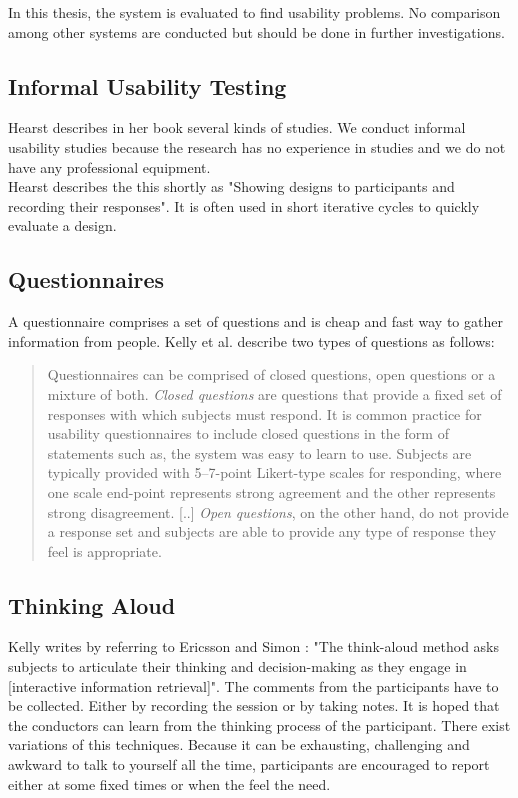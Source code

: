 \documentclass[11pt]{report}
\begin{document}
{{In this thesis, the system is evaluated to find usability problems. No comparison among other systems are conducted but should be done in further investigations.

\subsection{Informal Usability Testing}

Hearst \cite{Hearst2009} describes in her book several kinds of studies. We conduct informal usability studies because the research has no experience in studies and we do not have any professional equipment. \\

Hearst \cite{Hearst2009} describes the this shortly as "Showing designs to participants and recording their responses". It is often used in short iterative cycles to quickly evaluate a design.

\subsection{Questionnaires}

A questionnaire comprises a set of questions and is cheap and fast way to gather information from people. Kelly et al. \cite{Kelly2008} describe two types of questions as follows:

\begin{quote}
	Questionnaires can be comprised of closed questions, open questions or a mixture of both. \textit{Closed questions} are questions that provide a fixed set of responses with which subjects must respond. It is common practice for usability questionnaires to include closed questions in the form of statements such as, the system was easy to learn to use. Subjects are typically provided with 5–7-point Likert-type scales for responding, where one scale end-point represents strong agreement and the other represents strong disagreement. [..] \textit{Open questions}, on the other hand, do not provide a response set and subjects are able to provide any type of response they feel is appropriate. 
	\end{quote}


\subsection{Thinking Aloud}

Kelly \cite{Kelly2007} writes by referring to Ericsson and Simon \cite{Ericsson1993}: "The think-aloud method asks subjects to articulate their thinking and decision-making as they engage in [interactive information retrieval]". The comments from the participants have to be collected. Either by recording the session or by taking notes. It is hoped that the conductors can learn from the thinking process of the participant. There exist variations of this techniques. Because it can be exhausting, challenging and awkward to talk to yourself all the time, participants are encouraged to report either at some fixed times or when the feel the need.

}}
\end{document}

